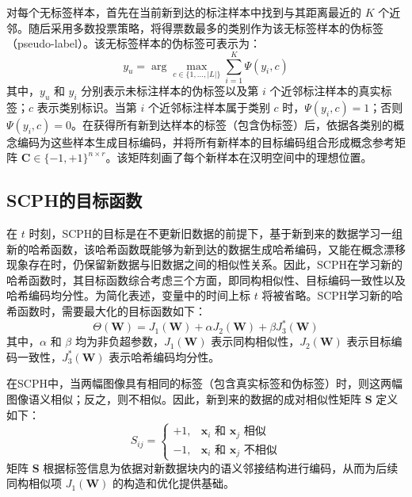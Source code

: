 对每个无标签样本，首先在当前新到达的标注样本中找到与其距离最近的 $K$ 个近邻。随后采用多数投票策略，将得票数最多的类别作为该无标签样本的伪标签（pseudo-label）。该无标签样本的伪标签可表示为：
\begin{equation}
  y_u = \arg\max_{c \in \{1, \dots, |L|\}} \sum_{i=1}^K \Psi(y_i, c)
\label{eq:scph-pseudolabel}
\end{equation}
其中，$y_u$ 和 $y_i$ 分别表示未标注样本的伪标签以及第 $i$ 个近邻标注样本的真实标签；$c$ 表示类别标识。当第 $i$ 个近邻标注样本属于类别 $c$ 时，$\Psi(y_i, c) = 1$；否则 $\Psi(y_i, c) = 0$。在获得所有新到达样本的标签（包含伪标签）后，依据各类别的概念编码为这些样本生成目标编码，并将所有新样本的目标编码组合形成概念参考矩阵 $\mathbf{C} \in \{-1, +1\}^{n \times r}$。该矩阵刻画了每个新样本在汉明空间中的理想位置。

\subsection{SCPH的目标函数}

在 $t$ 时刻，SCPH的目标是在不更新旧数据的前提下，基于新到来的数据学习一组新的哈希函数，该哈希函数既能够为新到达的数据生成哈希编码，又能在概念漂移现象存在时，仍保留新数据与旧数据之间的相似性关系。因此，SCPH在学习新的哈希函数时，其目标函数综合考虑三个方面，即同构相似性、目标编码一致性以及哈希编码均分性。为简化表述，变量中的时间上标 $t$ 将被省略。SCPH学习新的哈希函数时，需要最大化的目标函数如下：
\begin{equation}
  \Theta(\mathbf{W}) = J_1(\mathbf{W}) + \alpha J_2(\mathbf{W}) + \beta J_3^*(\mathbf{W})
\end{equation}
其中，$\alpha$ 和 $\beta$ 均为非负超参数，$J_1(\mathbf{W})$ 表示同构相似性，$J_2(\mathbf{W})$ 表示目标编码一致性，$J_3^*(\mathbf{W})$ 表示哈希编码均分性。

在SCPH中，当两幅图像具有相同的标签（包含真实标签和伪标签）时，则这两幅图像语义相似；反之，则不相似。因此，新到来的数据的成对相似性矩阵 $\mathbf{S}$ 定义如下：
\begin{equation}
  S_{ij} = \begin{cases} +1, & \mathbf{x}_i \text{ 和 } \mathbf{x}_j \text{ 相似} \\ -1, & \mathbf{x}_i \text{ 和 } \mathbf{x}_j \text{ 不相似} \end{cases}
\label{eq:scph-similarity}
\end{equation}
矩阵 $\mathbf{S}$ 根据标签信息为依据对新数据块内的语义邻接结构进行编码，从而为后续同构相似项 $J_1(\mathbf{W})$ 的构造和优化提供基础。


